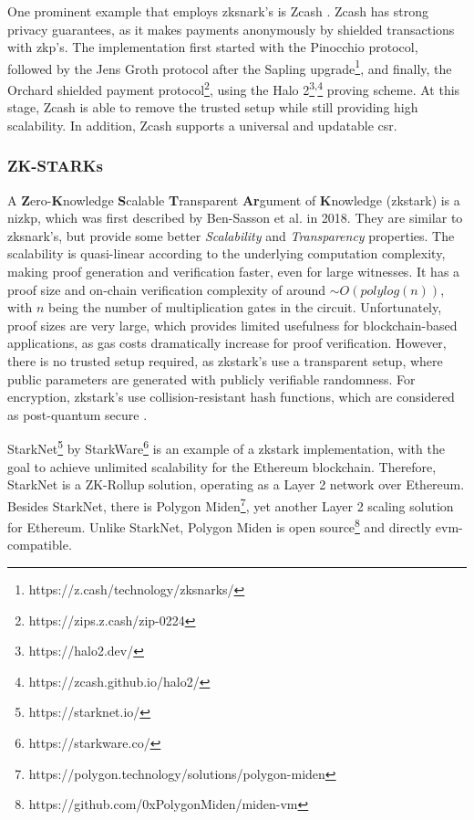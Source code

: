 One prominent example that employs \acrshort{zksnark}'s is Zcash \cite{bensassonZerocashDecentralizedAnonymous2014}. Zcash has strong privacy guarantees, as it makes payments anonymously by shielded transactions with \acrshort{zkp}'s. The implementation first started with the Pinocchio \cite{parnoPinocchioNearlyPractical} protocol, followed by the Jens Groth \cite{grothSizePairingBasedNoninteractive2016} protocol after the Sapling upgrade\footnote{https://z.cash/technology/zksnarks/}, and finally, the Orchard shielded payment protocol\footnote{https://zips.z.cash/zip-0224}, using the Halo 2{\footnote{https://halo2.dev/}\textsuperscript{,}\footnote{https://zcash.github.io/halo2/}} proving scheme. At this stage, Zcash is able to remove the trusted setup while still providing high scalability. In addition, Zcash supports a universal and updatable \acrshort{csr}.

\subsubsection{ZK-STARKs}
\label{subsubsec:zkstarks}

A \textbf{Z}ero-\textbf{K}nowledge \textbf{S}calable \textbf{T}ransparent \textbf{Ar}gument of \textbf{K}nowledge (\acrshort{zkstark}) is a \acrshort{nizkp}, which was first described by Ben-Sasson et al. \cite{ben-sassonScalableTransparentPostquantum} in 2018. They are similar to \acrshort{zksnark}'s, but provide some better \emph{Scalability} and \emph{Transparency} properties. The scalability is quasi-linear according to the underlying computation complexity, making proof generation and verification faster, even for large witnesses. It has a proof size and on-chain verification complexity of around $\sim O(polylog(n))$, with $n$ being the number of multiplication gates in the circuit. Unfortunately, proof sizes are very large, which provides limited usefulness for blockchain-based applications, as gas costs dramatically increase for proof verification. However, there is no trusted setup required, as \acrshort{zkstark}'s use a transparent setup, where public parameters are generated with publicly verifiable randomness. For encryption, \acrshort{zkstark}'s use collision-resistant hash functions, which are considered as post-quantum secure \cite{QuantumsafeCryptographyFundamentals}.

StarkNet\footnote{https://starknet.io/} by StarkWare\footnote{https://starkware.co/} is an example of a \acrshort{zkstark} implementation, with the goal to achieve unlimited scalability for the Ethereum blockchain. Therefore, StarkNet is a ZK-Rollup solution, operating as a Layer 2 network over Ethereum. Besides StarkNet, there is Polygon Miden\footnote{https://polygon.technology/solutions/polygon-miden}, yet another Layer 2 scaling solution for Ethereum. Unlike StarkNet, Polygon Miden is open source\footnote{https://github.com/0xPolygonMiden/miden-vm} and directly \acrfull{evm}-compatible.

